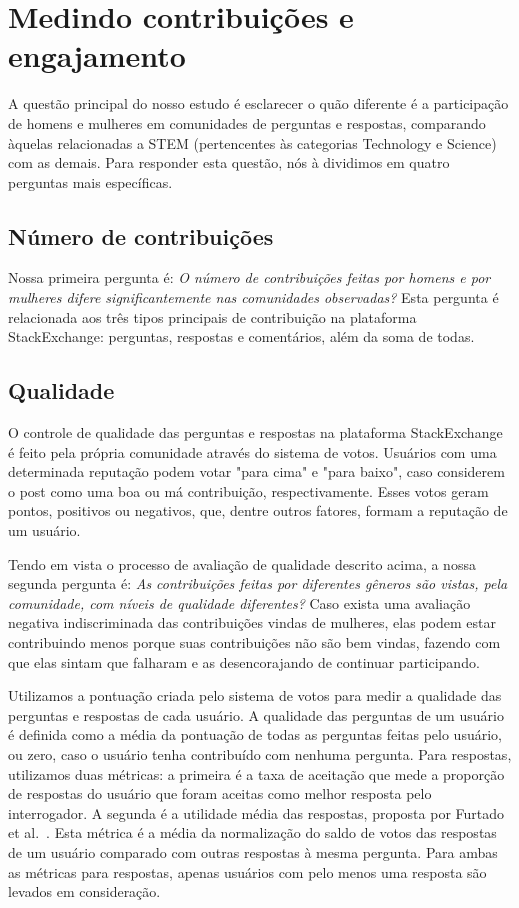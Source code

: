 \section{Medindo contribuições e engajamento}

A questão principal do nosso estudo é esclarecer o quão diferente é a participação de homens e mulheres em comunidades de perguntas e respostas, comparando àquelas relacionadas a STEM (pertencentes às categorias Technology e Science) com as demais. Para responder esta questão, nós à dividimos em quatro perguntas mais específicas.

\subsection{Número de contribuições}

Nossa primeira pergunta é: \textit{O número de contribuições feitas por homens e por mulheres difere significantemente nas comunidades observadas?} Esta pergunta é relacionada aos três tipos principais de contribuição na plataforma StackExchange: perguntas, respostas e comentários, além da soma de todas.

\subsection{Qualidade}

O controle de qualidade das perguntas e respostas na plataforma StackExchange é feito pela própria comunidade através do sistema de votos. Usuários com uma determinada reputação podem votar "para cima" e "para baixo", caso considerem o post como uma boa ou má contribuição, respectivamente. Esses votos geram pontos, positivos ou negativos, que, dentre outros fatores, formam a reputação de um usuário. 

Tendo em vista o processo de avaliação de qualidade descrito acima, a nossa segunda pergunta é: \textit{As contribuições feitas por diferentes gêneros são vistas, pela comunidade, com níveis de qualidade diferentes?} Caso exista uma avaliação negativa indiscriminada das contribuições vindas de mulheres, elas podem estar contribuindo menos porque suas contribuições não são bem vindas, fazendo com que elas sintam que falharam e as desencorajando de continuar participando. 

Utilizamos a pontuação criada pelo sistema de votos para medir a qualidade das perguntas e respostas de cada usuário. A qualidade das perguntas de um usuário é definida como a média da pontuação de todas as perguntas feitas pelo usuário, ou zero, caso o usuário tenha contribuído com nenhuma pergunta. Para respostas, utilizamos duas métricas: a primeira é a taxa de aceitação que mede a proporção de respostas do usuário que foram aceitas como melhor resposta pelo interrogador. A segunda é a utilidade média das respostas, proposta por Furtado et al.~\cite{furtado2013contributor}. Esta métrica é a média da normalização do saldo de votos das respostas de um usuário comparado com outras respostas à mesma pergunta. Para ambas as métricas para respostas, apenas usuários com pelo menos uma resposta são levados em consideração.


